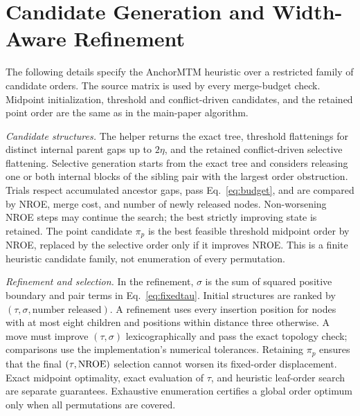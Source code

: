 \documentclass{vgtc}                %
\begin{document}
\begin{algorithm}[tp]
\caption{Optimal Merge Barriers for a Fixed Leaf Order}\label{alg:barriers}
\end{algorithm}

\section{Candidate Generation and Width-Aware Refinement}\label{sec:search}
The following details specify the AnchorMTM heuristic over a restricted family of candidate orders. The source matrix is used by every merge-budget check. Midpoint initialization, threshold and conflict-driven candidates, and the retained point order are the same as in the main-paper algorithm.

\emph{Candidate structures.} The helper returns the exact tree, threshold flattenings for distinct internal parent gaps up to $2\eta$, and the retained conflict-driven selective flattening. Selective generation starts from the exact tree and considers releasing one or both internal blocks of the sibling pair with the largest order obstruction. Trials respect accumulated ancestor gaps, pass Eq.~\ref{eq:budget}, and are compared by NROE, merge cost, and number of newly released nodes. Non-worsening NROE steps may continue the search; the best strictly improving state is retained. The point candidate $\pi_p$ is the best feasible threshold midpoint order by NROE, replaced by the selective order only if it improves NROE. This is a finite heuristic candidate family, not enumeration of every permutation.

\emph{Refinement and selection.} In the refinement, $\sigma$ is the sum of squared positive boundary and pair terms in Eq.~\ref{eq:fixedtau}. Initial structures are ranked by $(\tau,\sigma,\text{number released})$. A refinement uses every insertion position for nodes with at most eight children and positions within distance three otherwise. A move must improve $(\tau,\sigma)$ lexicographically and pass the exact topology check; comparisons use the implementation's numerical tolerances. Retaining $\pi_p$ ensures that the final $(\tau,\mathrm{NROE})$ selection cannot worsen its fixed-order displacement. Exact midpoint optimality, exact evaluation of $\tau$, and heuristic leaf-order search are separate guarantees. Exhaustive enumeration certifies a global order optimum only when all permutations are covered.
\end{document}
